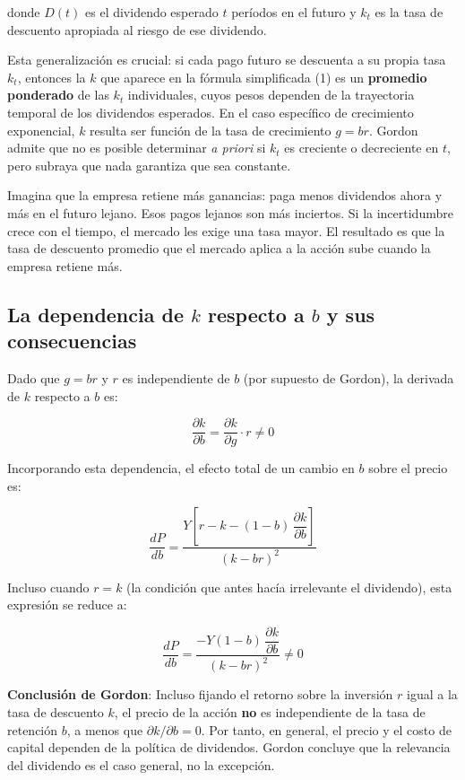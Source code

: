 \documentclass[12pt]{article}
\begin{document}
donde $D(t)$ es el dividendo esperado $t$ per\'iodos en el futuro y $k_t$ es la tasa de descuento apropiada al riesgo de ese dividendo.

\begin{explicacion}
Esta generalizaci\'on es crucial: si cada pago futuro se descuenta a su propia tasa $k_t$, entonces la $k$ que aparece en la f\'ormula simplificada (1) es un \textbf{promedio ponderado} de las $k_t$ individuales, cuyos pesos dependen de la trayectoria temporal de los dividendos esperados. En el caso espec\'ifico de crecimiento exponencial, $k$ resulta ser funci\'on de la tasa de crecimiento $g = br$. Gordon admite que no es posible determinar \textit{a priori} si $k_t$ es creciente o decreciente en $t$, pero subraya que nada garantiza que sea constante.
\end{explicacion}

\begin{intuicion}
Imagina que la empresa retiene m\'as ganancias: paga menos dividendos ahora y m\'as en el futuro lejano. Esos pagos lejanos son m\'as inciertos. Si la incertidumbre crece con el tiempo, el mercado les exige una tasa mayor. El resultado es que la tasa de descuento promedio que el mercado aplica a la acci\'on sube cuando la empresa retiene m\'as.
\end{intuicion}

\subsection{La dependencia de $k$ respecto a $b$ y sus consecuencias}

Dado que $g = br$ y $r$ es independiente de $b$ (por supuesto de Gordon), la derivada de $k$ respecto a $b$ es:

\[
\frac{\partial k}{\partial b} = \frac{\partial k}{\partial g} \cdot r \neq 0
\]

Incorporando esta dependencia, el efecto total de un cambio en $b$ sobre el precio es:

\[
\frac{dP}{db} = \frac{Y\!\left[r - k - (1-b)\,\dfrac{\partial k}{\partial b}\right]}{(k-br)^2}
\]

Incluso cuando $r = k$ (la condici\'on que antes hac\'ia irrelevante el dividendo), esta expresi\'on se reduce a:

\[
\frac{dP}{db} = \frac{-Y(1-b)\,\dfrac{\partial k}{\partial b}}{(k-br)^2} \neq 0
\]

\begin{explicacion}
\textbf{Conclusi\'on de Gordon}: Incluso fijando el retorno sobre la inversi\'on $r$ igual a la tasa de descuento $k$, el precio de la acci\'on \textbf{no} es independiente de la tasa de retenci\'on $b$, a menos que $\partial k/\partial b = 0$. Por tanto, en general, el precio y el costo de capital dependen de la pol\'itica de dividendos. Gordon concluye que la relevancia del dividendo es el caso general, no la excepci\'on.
\end{explicacion}
\end{document}
